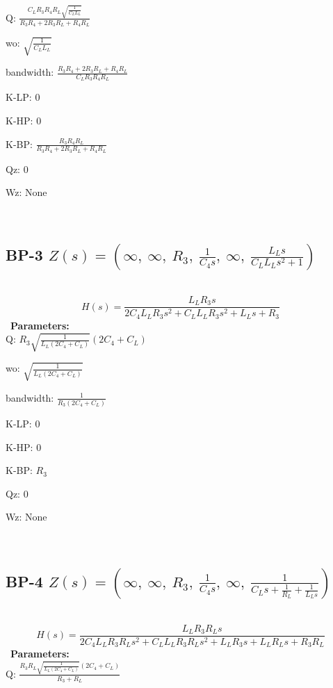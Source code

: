 \documentclass{article}
\begin{document}
Q: $\frac{C_{L} R_{3} R_{4} R_{L} \sqrt{\frac{1}{C_{L} L_{L}}}}{R_{3} R_{4} + 2 R_{3} R_{L} + R_{4} R_{L}}$\ 

wo: $\sqrt{\frac{1}{C_{L} L_{L}}}$\ 

bandwidth: $\frac{R_{3} R_{4} + 2 R_{3} R_{L} + R_{4} R_{L}}{C_{L} R_{3} R_{4} R_{L}}$\ 

K-LP: $0$\ 

K-HP: $0$\ 

K-BP: $\frac{R_{3} R_{4} R_{L}}{R_{3} R_{4} + 2 R_{3} R_{L} + R_{4} R_{L}}$\ 

Qz: $0$\ 

Wz: $\text{None}$\ 

\ 

\subsection{BP-3 $Z(s) = \left( \infty, \  \infty, \  R_{3}, \  \frac{1}{C_{4} s}, \  \infty, \  \frac{L_{L} s}{C_{L} L_{L} s^{2} + 1}\right)$ } \ 
\textbf{\[H(s) = \frac{L_{L} R_{3} s}{2 C_{4} L_{L} R_{3} s^{2} + C_{L} L_{L} R_{3} s^{2} + L_{L} s + R_{3}}\] } \ 
\textbf{Parameters:}\\ 

Q: $R_{3} \sqrt{\frac{1}{L_{L} \left(2 C_{4} + C_{L}\right)}} \left(2 C_{4} + C_{L}\right)$\ 

wo: $\sqrt{\frac{1}{L_{L} \left(2 C_{4} + C_{L}\right)}}$\ 

bandwidth: $\frac{1}{R_{3} \left(2 C_{4} + C_{L}\right)}$\ 

K-LP: $0$\ 

K-HP: $0$\ 

K-BP: $R_{3}$\ 

Qz: $0$\ 

Wz: $\text{None}$\ 

\ 

\subsection{BP-4 $Z(s) = \left( \infty, \  \infty, \  R_{3}, \  \frac{1}{C_{4} s}, \  \infty, \  \frac{1}{C_{L} s + \frac{1}{R_{L}} + \frac{1}{L_{L} s}}\right)$ } \ 
\textbf{\[H(s) = \frac{L_{L} R_{3} R_{L} s}{2 C_{4} L_{L} R_{3} R_{L} s^{2} + C_{L} L_{L} R_{3} R_{L} s^{2} + L_{L} R_{3} s + L_{L} R_{L} s + R_{3} R_{L}}\] } \ 
\textbf{Parameters:}\\ 

Q: $\frac{R_{3} R_{L} \sqrt{\frac{1}{L_{L} \left(2 C_{4} + C_{L}\right)}} \left(2 C_{4} + C_{L}\right)}{R_{3} + R_{L}}$\ 
\end{document}
